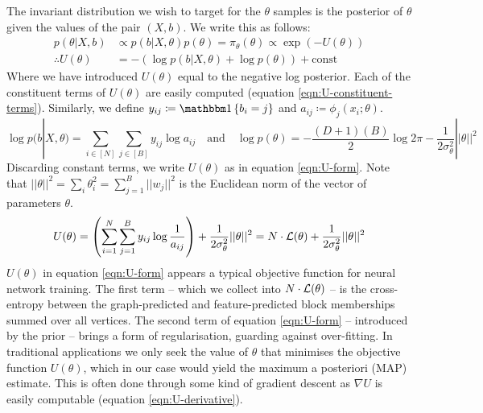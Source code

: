 The invariant distribution we wish to target for the $\theta$ samples is the posterior of $\theta$ given the values of the pair $(X, b)$. We write this as follows:
%
\begin{align}
	p(\theta | X, b) &\propto p(b | X, \theta) p(\theta) = \pi_\theta (\theta) \propto  \exp \left( - U(\theta) \right) \\
	\therefore U(\theta) &= - \left( \log p(b | X, \theta) + \log p(\theta) \right) + \textrm{const}
\end{align}
%
Where we have introduced $U(\theta)$ equal to the negative log posterior. Each of the constituent terms of $U(\theta)$ are easily computed (equation \ref{eqn:U-constituent-terms}). Similarly, we define $y_{ij} \coloneqq \one \left\{ b_i = j \right\}$ and $a_{ij} \coloneqq \phi_j(x_i; \theta)$.
%
\begin{equation}
	\log p(b | X, \theta) = \sum_{i \in [N]} \sum_{j \in [B]} y_{ij} \log a_{ij}  \quad \textrm{and} \quad
	\log p(\theta) = -\frac{(D+1)(B)}{2} \log 2\pi - \frac{1}{2 \sigma_\theta^2} || \theta ||^2
	\label{eqn:U-constituent-terms}
\end{equation}
%
Discarding constant terms, we write $U(\theta)$ as in equation \ref{eqn:U-form}. Note that $||\theta||^2 = \sum_{i} \theta_{i}^2 = \sum_{j=1}^{B} ||w_j||^2$ is the Euclidean norm of the vector of parameters $\theta$.
%
\begin{equation}
	U(\theta) = \left( \sum_{i=1}^{N} \sum_{j=1}^{B} y_{ij} \log \frac{1}{a_{ij}} \right)
	+ \frac{1}{2\sigma_\theta^2} ||\theta||^2 = N \cdot \mathcal{L}(\theta) + \frac{1}{2\sigma_\theta^2} ||\theta||^2
	\label{eqn:U-form}
\end{equation}
%
$U(\theta)$ in equation \ref{eqn:U-form} appears a typical objective function for neural network training. The first term -- which we collect into $N \cdot \mathcal{L}(\theta)$ -- is the cross-entropy between the graph-predicted and feature-predicted block memberships summed over all vertices. The second term of equation \ref{eqn:U-form} -- introduced by the prior -- brings a form of regularisation, guarding against over-fitting. In traditional applications we only seek the value of $\theta$ that minimises the objective function $U(\theta)$, which in our case would yield the maximum a posteriori (MAP) estimate. This is often done through some kind of gradient descent as $\nabla U$ is easily computable (equation \ref{eqn:U-derivative}).

